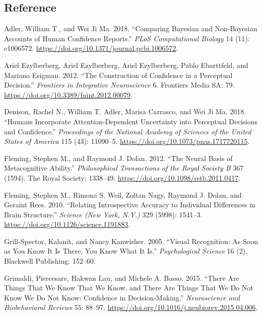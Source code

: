 \documentclass[]{article}
\begin{document}
\hypertarget{reference}{%
\subsection*{Reference}\label{reference}}

\hypertarget{refs}{}
\leavevmode\hypertarget{ref-adler2018pcb}{}%
Adler, William T., and Wei Ji Ma. 2018. ``Comparing Bayesian and
Non-Bayesian Accounts of Human Confidence Reports.'' \emph{PLoS
Computational Biology} 14 (11): e1006572.
\url{https://doi.org/10.1371/journal.pcbi.1006572}.

\leavevmode\hypertarget{ref-arielezylberberg2012fin}{}%
Ariel Ezylberberg, Ariel Ezylberberg, Ariel Ezylberberg, Pablo
Ebarttfeld, and Mariano Esigman. 2012. ``The Construction of Confidence
in a Perceptual Decision.'' \emph{Frontiers in Integrative Neuroscience}
6. Frontiers Media SA: 79.
\url{https://doi.org/10.3389/fnint.2012.00079}.

\leavevmode\hypertarget{ref-denison2018pnasusa}{}%
Denison, Rachel N., William T. Adler, Marisa Carrasco, and Wei Ji Ma.
2018. ``Humans Incorporate Attention-Dependent Uncertainty into
Perceptual Decisions and Confidence.'' \emph{Proceedings of the National
Academy of Sciences of the United States of America} 115 (43): 11090--5.
\url{https://doi.org/10.1073/pnas.1717720115}.

\leavevmode\hypertarget{ref-fleming2012ptrsb}{}%
Fleming, Stephen M., and Raymond J. Dolan. 2012. ``The Neural Basis of
Metacognitive Ability.'' \emph{Philosophical Transactions of the Royal
Society B} 367 (1594). The Royal Society: 1338--49.
\url{https://doi.org/10.1098/rstb.2011.0417}.

\leavevmode\hypertarget{ref-fleming_relating_2010}{}%
Fleming, Stephen M., Rimona S. Weil, Zoltan Nagy, Raymond J. Dolan, and
Geraint Rees. 2010. ``Relating Introspective Accuracy to Individual
Differences in Brain Structure.'' \emph{Science (New York, N.Y.)} 329
(5998): 1541--3. \url{https://doi.org/10.1126/science.1191883}.

\leavevmode\hypertarget{ref-grill-spector2005ps}{}%
Grill-Spector, Kalanit, and Nancy Kanwisher. 2005. ``Visual Recognition:
As Soon as You Know It Is There, You Know What It Is.''
\emph{Psychological Science} 16 (2). Blackwell Publishing: 152--60.

\leavevmode\hypertarget{ref-grimaldi2015nbr}{}%
Grimaldi, Piercesare, Hakwan Lau, and Michele A. Basso. 2015. ``There
Are Things That We Know That We Know, and There Are Things That We Do
Not Know We Do Not Know: Confidence in Decision-Making.''
\emph{Neuroscience and Biobehavioral Reviews} 55: 88--97.
\url{https://doi.org/10.1016/j.neubiorev.2015.04.006}.
\end{document}
